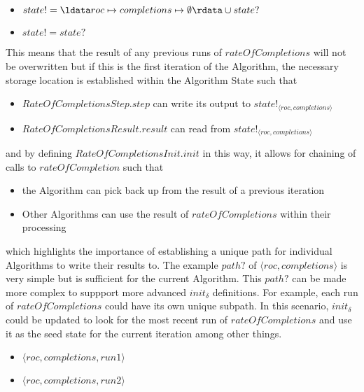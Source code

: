 \documentclass[../main.tex]{subfiles}
\begin{document}
\begin{itemize}
\item $state! = \ldata roc \mapsto completions \mapsto \emptyset \rdata \cup state?$
\item $state! = state?$
\end{itemize}
This means that the result of any previous runs of $rateOfCompletions$ will not be overwritten
but if this is the first iteration of the Algorithm, the necessary storage location is established
within the Algorithm State such that
\begin{itemize}
\item $RateOfCompletionsStep.step$ can write its output to $state!_{\langle roc, completions \rangle}$
\item $RateOfCompletionsResult.result$ can read from $state!_{\langle roc, completions \rangle}$
\end{itemize}
and by defining $RateOfCompletionsInit.init$ in this way, it allows for chaining of calls to $rateOfCompletion$ such that
\begin{itemize}
\item the Algorithm can pick back up from the result of a previous iteration
\item Other Algorithms can use the result of $rateOfCompletions$ within their processing
\end{itemize}
which highlights the importance of establishing a unique path for individual Algorithms to write their results to.
The example $path?$ of $\langle roc, completions \rangle$ is very simple but is sufficient for the current Algorithm.
This $path?$ can be made more complex to suppport more advanced $init_{\delta}$ definitions. For example, each run of
$rateOfCompletions$ could have its own unique subpath. In this scenario, $init_{\delta}$ could be updated to look for
the most recent run of $rateOfCompletions$ and use it as the seed state for the current iteration among other things.
\begin{itemize}
\item $\langle roc, completions, run1 \rangle$
\item $\langle roc, completions, run2 \rangle$
\end{itemize}
\end{document}
